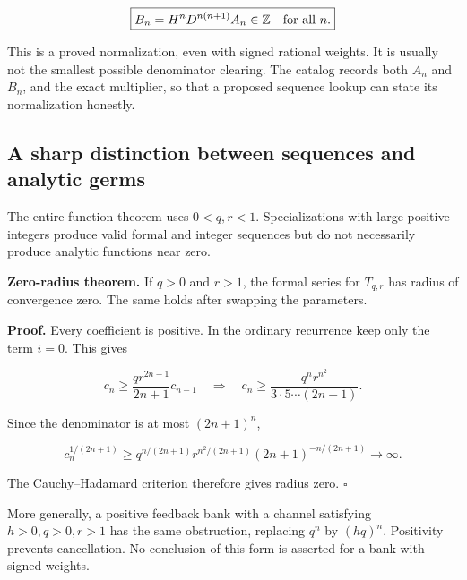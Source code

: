 \[
\boxed{B_n=H^nD^{n(n+1)}A_n\in\mathbb Z\quad\hbox{for all }n.}
\]

This is a proved normalization, even with signed rational weights. It is
usually not the smallest possible denominator clearing. The catalog
records both \(A_n\) and \(B_n\), and the exact multiplier, so that a
proposed sequence lookup can state its normalization honestly.

\hypertarget{a-sharp-distinction-between-sequences-and-analytic-germs}{%
\subsection{A sharp distinction between sequences and analytic
germs}\label{a-sharp-distinction-between-sequences-and-analytic-germs}}

The entire-function theorem uses \(0<q,r<1\). Specializations with large
positive integers produce valid formal and integer sequences but do not
necessarily produce analytic functions near zero.

\textbf{Zero-radius theorem.} If \(q>0\) and \(r>1\), the formal series
for \(T_{q,r}\) has radius of convergence zero. The same holds after
swapping the parameters.

\textbf{Proof.} Every coefficient is positive. In the ordinary
recurrence keep only the term \(i=0\). This gives

\[
c_n\ge\frac{q r^{2n-1}}{2n+1}c_{n-1}
\quad\Longrightarrow\quad
c_n\ge\frac{q^n r^{n^2}}{3\cdot5\cdots(2n+1)}.
\]

Since the denominator is at most \((2n+1)^n\),

\[
c_n^{1/(2n+1)}\ge
q^{n/(2n+1)}r^{n^2/(2n+1)}(2n+1)^{-n/(2n+1)}\longrightarrow\infty.
\]

The Cauchy--Hadamard criterion therefore gives radius zero. \(\square\)

More generally, a positive feedback bank with a channel satisfying
\(h>0,q>0,r>1\) has the same obstruction, replacing \(q^n\) by
\((hq)^n\). Positivity prevents cancellation. No conclusion of this form
is asserted for a bank with signed weights.

